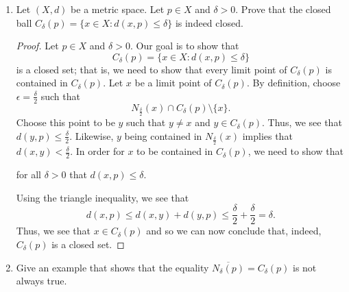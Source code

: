 \documentclass[a4paper]{article}
\begin{document}
\begin{enumerate}
\begin{enumerate}
\begin{proof}
                The last case is similar to (ii). Let \( \epsilon > 0 \). If \( x  \) is a limit point of \( (-\infty, b] \), then \( {N}_{\epsilon}(x) \cap [- \infty, b) \setminus  \{ x  \} \neq \emptyset \) implies that we can pick \( p \neq x  \) such that \( p \in [- \infty ,  b) \). Since \( \epsilon > 0 \) is arbitrary, we have
                \[  q - \epsilon < x < q + \epsilon \leq b + \epsilon \]
                implies 
                \[  q < x \leq b.  \]
                Hence, \( x \in (-\infty, b] \) and so \( (- \infty , b]  \) is a closed set.
                \end{proof}
        \end{enumerate}
    \item Let \( (X,d) \) be a metric space. Let \( p \in X   \) and \( \delta > 0  \). Prove that the closed ball \( {C}_{\delta}(p) = \{ x \in X : d(x,p) \leq \delta  \}  \) is indeed closed.
        \begin{proof}
        Let \( p \in X  \) and \( \delta > 0  \). Our goal is to show that 
        \[  {C}_{\delta}(p) = \{ x \in X   : d(x,p) \leq \delta \} \]
        is a closed set; that is, we need to show that every limit point of \( {C}_{\delta}(p) \) is contained in \( {C}_{\delta}(p) \). Let \( x  \) be a limit point of \( {C}_{\delta}(p) \). By definition, choose \( \epsilon = \frac{ \delta }{ 2 }  \) such that  
        \[  {N}_{\frac{ \delta }{ 2 } }(x) \cap {C}_{\delta}(p) \setminus  \{ x  \}.  \]
        Choose this point to be \( y  \) such that \( y \neq x  \) and \( y \in {C}_{\delta}(p) \). Thus, we see that \( d(y,p) \leq \frac{ \delta }{ 2 }  \). Likewise, \( y  \) being contained in \( {N}_{\frac{ \delta }{ 2 } }(x)  \) implies that \( d(x,y) < \frac{ \delta }{ 2 }  \). In order for \( x  \) to be contained in \( {C}_{\delta}(p) \), we need to show that         
        \begin{center}
            for all \( \delta > 0  \) that \( d(x,p) \leq \delta  \).
        \end{center}
        Using the triangle inequality, we see that 
        \[  d(x,p) \leq d(x,y) + d(y,p) \leq \frac{ \delta }{ 2 }  + \frac{ \delta }{ 2 }  = \delta.  \]
        Thus, we see that \( x \in {C}_{\delta}(p) \) and so we can now conclude that, indeed, \( C_{\delta}(p) \) is a closed set.
    \end{proof}
    \item Give an example that shows that the equality \( \overline{{N}_{\delta}(p)} = {C}_{\delta}(p)  \) is not always true.
        \begin{solution}

\end{solution}
\end{enumerate}
\end{document}
